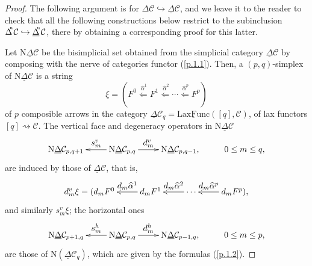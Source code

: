 \documentclass[]{amsart}
\begin{document}
\begin{proof}

The following argument  is for ${{\ensuremath{\Delta}}{\ensuremath{\mathcal{C}}}\hookrightarrow {\ensuremath{\underline{\Delta}}}{\ensuremath{\mathcal{C}}}}$, and we leave it to the reader
to check that all the following constructions below restrict to the subinclusion
${\ensuremath{\Delta}}\hspace{-3pt}^{^\mathrm{u}}{\ensuremath{\mathcal{C}}}\hookrightarrow{\ensuremath{\underline{\Delta}}}\hspace{-3pt}^{^\mathrm{u}}{\ensuremath{\mathcal{C}}}$, there by
obtaining a corresponding proof for this latter.

Let  ${\ensuremath{\mathrm{N}}}{\ensuremath{\underline{\Delta}}}{\ensuremath{\mathcal{C}}}$ be the bisimplicial set obtained from the simplicial category ${\ensuremath{\underline{\Delta}}}{\ensuremath{\mathcal{C}}}$ by
composing with the nerve of categories functor (\ref{p.1.1}). Then, a $(p,q)$-simplex of
${\ensuremath{\mathrm{N}}}{\ensuremath{\underline{\Delta}}}{\ensuremath{\mathcal{C}}}$  is  a string
$$
\xi=(F^0\overset{\ \textstyle \widehat{\alpha}^1}\Longleftarrow F^1 \overset{\ \textstyle
\widehat{\alpha}^2}\Longleftarrow \cdots \overset{\ \textstyle \widehat{\alpha}^p}\Longleftarrow
F^p)
$$
of $p$ composible arrows in the category  ${\ensuremath{\underline{\Delta}}}{\ensuremath{\mathcal{C}}}_q={\ensuremath{\underline{\mathrm{LaxFunc}}}}([q],{\ensuremath{\mathcal{C}}})$, of lax functors
$[q]\rightsquigarrow{\ensuremath{\mathcal{C}}}$. The vertical face and degeneracy operators in ${\ensuremath{\mathrm{N}}}{\ensuremath{\underline{\Delta}}}{\ensuremath{\mathcal{C}}}$
$$
\xymatrix@C=9pt@R=9pt{ {\ensuremath{\mathrm{N}}}{\ensuremath{\underline{\Delta}}}{\ensuremath{\mathcal{C}}}_{p,q+1} && {\ensuremath{\mathrm{N}}}{\ensuremath{\underline{\Delta}}}{\ensuremath{\mathcal{C}}}_{p,q} \ar[ll]_-{\textstyle s_m^v}
\ar[rr]^-{\textstyle d_m^v} && {\ensuremath{\mathrm{N}}}{\ensuremath{\underline{\Delta}}}{\ensuremath{\mathcal{C}}}_{p,q-1}, && 0\leq m\leq q,\\ }
$$
 are induced by those of ${\ensuremath{\underline{\Delta}}}{\ensuremath{\mathcal{C}}}$, that is,
$$\xymatrix{d_m^v\xi=(d_mF^0&\ar@{=>}[l]_-{\textstyle d_m\widehat{\alpha}^1}d_mF^1& \ar@{=>}[l]_-{ \textstyle d_m\widehat{\alpha}^2} \cdots& \ar@{=>}[l]_-{ \textstyle d_m\widehat{\alpha}^p} d_mF^p),}$$
and similarly  $s_m^v\xi$;  the  horizontal ones
$$
\xymatrix@C=9pt@R=9pt{ {\ensuremath{\mathrm{N}}}{\ensuremath{\underline{\Delta}}}{\ensuremath{\mathcal{C}}}_{p+1,q} && {\ensuremath{\mathrm{N}}}{\ensuremath{\underline{\Delta}}}{\ensuremath{\mathcal{C}}}_{p,q} \ar[ll]_-{\textstyle s_m^h}
\ar[rr]^-{\textstyle d_m^h} && {\ensuremath{\mathrm{N}}}{\ensuremath{\underline{\Delta}}}{\ensuremath{\mathcal{C}}}_{p-1,q}, && 0\leq m\leq p,\\ }
$$
are those of  ${\ensuremath{\mathrm{N}}}({\ensuremath{\underline{\Delta}}}{\ensuremath{\mathcal{C}}}_q)$, which are given by the formulas (\ref{p.1.2}).


\end{proof}
\end{document}
